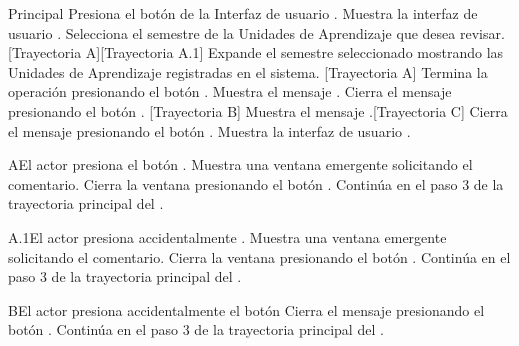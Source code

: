\begin{UCtrayectoria}{Principal}
    \UCpaso[\UCactor] Presiona el botón  de la Interfaz de usuario  .
    \UCpaso Muestra la interfaz de usuario .
    \UCpaso[\UCactor] Selecciona el semestre de la Unidades de Aprendizaje que desea revisar. [Trayectoria A][Trayectoria A.1]
    \UCpaso Expande el semestre seleccionado mostrando las Unidades de Aprendizaje registradas en el sistema. [Trayectoria A]
    \UCpaso[\UCactor] Termina la operación presionando el botón .
    \UCpaso Muestra el mensaje .
    \UCpaso[\UCactor] Cierra el mensaje presionando el botón . [Trayectoria B]
    \UCpaso Muestra el mensaje .[Trayectoria C]
    \UCpaso[\UCactor] Cierra el mensaje presionando el botón .
    \UCpaso Muestra la interfaz de usuario .
\end{UCtrayectoria}
\begin{UCtrayectoriaA}{A}{El actor presiona el botón .}
    \UCpaso Muestra una ventana emergente solicitando el comentario.
    \UCpaso[\UCactor] Cierra la ventana presionando el botón .
    \UCpaso Continúa en el paso 3 de la trayectoria principal del .
\end{UCtrayectoriaA}
\begin{UCtrayectoriaA}{A.1}{El actor presiona accidentalmente .}
    \UCpaso Muestra una ventana emergente solicitando el comentario.
    \UCpaso[\UCactor] Cierra la ventana presionando el botón .
    \UCpaso Continúa en el paso 3 de la trayectoria principal del .
\end{UCtrayectoriaA}
\begin{UCtrayectoriaA}{B}{El actor presiona accidentalmente el botón }
    \UCpaso[\UCactor] Cierra el mensaje presionando el botón .
    \UCpaso Continúa en el paso 3 de la trayectoria principal del .
\end{UCtrayectoriaA}

